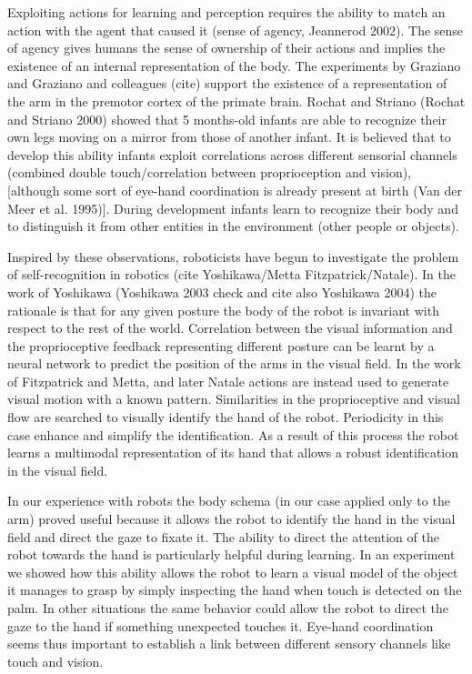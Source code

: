 Exploiting actions for learning and perception requires the ability to match an action with the agent that caused it (sense of agency, Jeannerod 2002). The sense of agency gives humans the sense of ownership of their actions and implies the existence of an internal representation of the body. The experiments by Graziano and Graziano and colleagues (cite) support the existence of a representation of the arm in the premotor cortex of the primate brain. Rochat and Striano (Rochat and Striano 2000) showed that 5 months-old infants are able to recognize their own legs moving on a mirror from those of another infant. It is believed that to develop this ability infants exploit correlations across different sensorial channels (combined double touch/correlation between proprioception and vision), [although some sort of eye-hand coordination is already present at birth (Van der Meer et al. 1995)]. During development infants learn to recognize their body and to distinguish it from other entities in the environment (other people or objects). 

Inspired by these observations, roboticists have begun to investigate the problem of self-recognition in robotics (cite Yoshikawa/Metta Fitzpatrick/Natale). In the work of Yoshikawa (Yoshikawa 2003 check and cite also Yoshikawa 2004) the rationale is that for any given posture the body of the robot is invariant with respect to the rest of the world. Correlation between the visual information and the proprioceptive feedback representing different posture can be learnt by a neural network to predict the position of the arms in the visual field. In the work of Fitzpatrick and Metta, and later Natale actions are instead used to generate visual motion with a known pattern. Similarities in the proprioceptive and visual flow are searched to visually identify the hand of the robot. Periodicity in this case enhance and simplify the identification. As a result of this process the robot learns a multimodal representation of its hand that allows a robust identification in the visual field.

In our experience with robots the body schema (in our case applied only to the arm) proved useful because it allows the robot to identify the hand in the visual field and direct the gaze to fixate it. The ability to direct the attention of the robot towards the hand is particularly helpful during learning. In an experiment we showed how this ability allows the robot to learn a visual model of the object it manages to grasp by simply inspecting the hand when touch is detected on the palm. In other situations the same behavior could allow the robot to direct the gaze to the hand if something unexpected touches it. Eye-hand coordination seems thus important to establish a link between different sensory channels like touch and vision.

